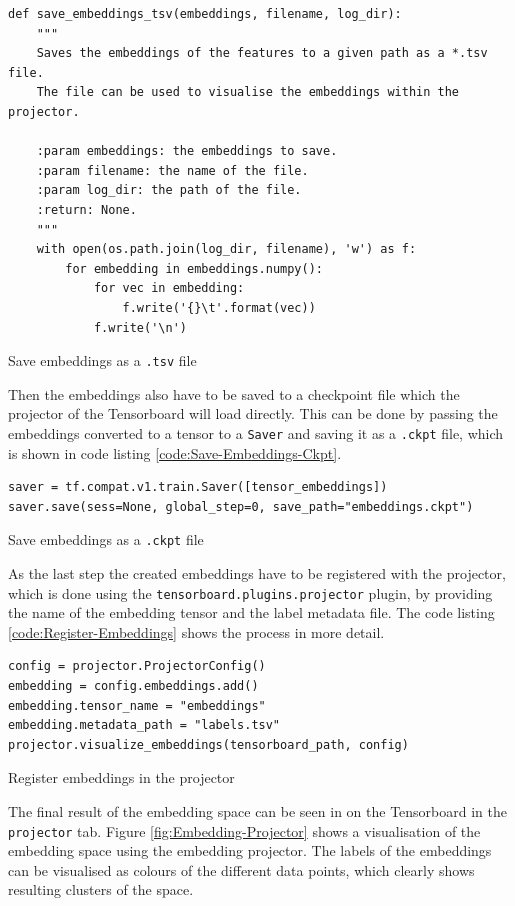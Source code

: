 \begin{code}[htbp]
\begin{verbatim}
def save_embeddings_tsv(embeddings, filename, log_dir):
    """
    Saves the embeddings of the features to a given path as a *.tsv file.
    The file can be used to visualise the embeddings within the projector.

    :param embeddings: the embeddings to save.
    :param filename: the name of the file.
    :param log_dir: the path of the file.
    :return: None.
    """
    with open(os.path.join(log_dir, filename), 'w') as f:
        for embedding in embeddings.numpy():
            for vec in embedding:
                f.write('{}\t'.format(vec))
            f.write('\n')
\end{verbatim}
\caption{Save embeddings as a \texttt{.tsv} file}
\label{code:Save-Embeddings}
\end{code}
\noindent
Then the embeddings also have to be saved to a checkpoint file which the projector of the Tensorboard will load directly. This can be done by passing the embeddings converted to a tensor to a \texttt{Saver} and saving it as a \texttt{.ckpt} file, which is shown in code listing \ref{code:Save-Embeddings-Ckpt}.

\begin{code}[htbp]
\begin{verbatim}
saver = tf.compat.v1.train.Saver([tensor_embeddings])
saver.save(sess=None, global_step=0, save_path="embeddings.ckpt")
\end{verbatim}
\caption{Save embeddings as a \texttt{.ckpt} file}
\label{code:Save-Embeddings-Ckpt}
\end{code}
\noindent
As the last step the created embeddings have to be registered with the projector, which is done using the \texttt{tensorboard.plugins.projector} plugin, by providing the name of the embedding tensor and the label metadata file. The code listing \ref{code:Register-Embeddings} shows the process in more detail.

\begin{code}[htbp]
\begin{verbatim}
config = projector.ProjectorConfig()
embedding = config.embeddings.add()
embedding.tensor_name = "embeddings"
embedding.metadata_path = "labels.tsv"
projector.visualize_embeddings(tensorboard_path, config)
\end{verbatim}
\caption{Register embeddings in the projector}
\label{code:Register-Embeddings}
\end{code}
\noindent
The final result of the embedding space can be seen in on the Tensorboard in the \texttt{projector} tab. Figure \ref{fig:Embedding-Projector} shows a visualisation of the embedding space using the embedding projector. The labels of the embeddings can be visualised as colours of the different data points, which clearly shows resulting clusters of the space.

